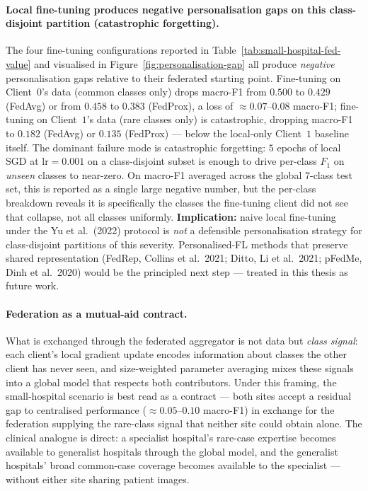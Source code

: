 \documentclass[11pt,a4paper]{report}
\begin{document}
\paragraph{Local fine-tuning produces negative personalisation
gaps on this class-disjoint partition (catastrophic forgetting).}
The four fine-tuning configurations reported in
Table~\ref{tab:small-hospital-fed-value} and visualised in
Figure~\ref{fig:personalisation-gap} all produce \emph{negative}
personalisation gaps relative to their federated starting point.
Fine-tuning on Client~$0$'s data (common classes only) drops macro-F1
from $0.500$ to $0.429$ (FedAvg) or from $0.458$ to $0.383$ (FedProx),
a loss of $\approx 0.07$--$0.08$ macro-F1; fine-tuning on
Client~$1$'s data (rare classes only) is catastrophic, dropping
macro-F1 to $0.182$ (FedAvg) or $0.135$ (FedProx) --- below the
local-only Client~$1$ baseline itself. The dominant failure mode is
catastrophic forgetting: $5$ epochs of local SGD at $\text{lr} =
0.001$ on a class-disjoint subset is enough to drive per-class
$F_1$ on \emph{unseen} classes to near-zero. On macro-F1 averaged
across the global $7$-class test set, this is reported as a single
large negative number, but the per-class breakdown reveals it is
specifically the classes the fine-tuning client did not see that
collapse, not all classes uniformly.
\textbf{Implication:} naive local fine-tuning under the Yu et al.\
(2022) protocol is \emph{not} a defensible personalisation strategy
for class-disjoint partitions of this severity. Personalised-FL
methods that preserve shared representation (FedRep, Collins et al.\
2021; Ditto, Li et al.\ 2021; pFedMe, Dinh et al.\ 2020) would be
the principled next step --- treated in this thesis as future work.

\paragraph{Federation as a mutual-aid contract.}
What is exchanged through the federated aggregator is not data but
\emph{class signal}: each client's local gradient update encodes
information about classes the other client has never seen, and
size-weighted parameter averaging mixes these signals into a
global model that respects both contributors. Under this framing,
the small-hospital scenario is best read as a contract --- both
sites accept a residual gap to centralised performance ($\approx
0.05$--$0.10$ macro-F1) in exchange for the federation supplying
the rare-class signal that neither site could obtain alone. The
clinical analogue is direct: a specialist hospital's rare-case
expertise becomes available to generalist hospitals through the
global model, and the generalist hospitals' broad common-case
coverage becomes available to the specialist --- without either
site sharing patient images.
\end{document}

